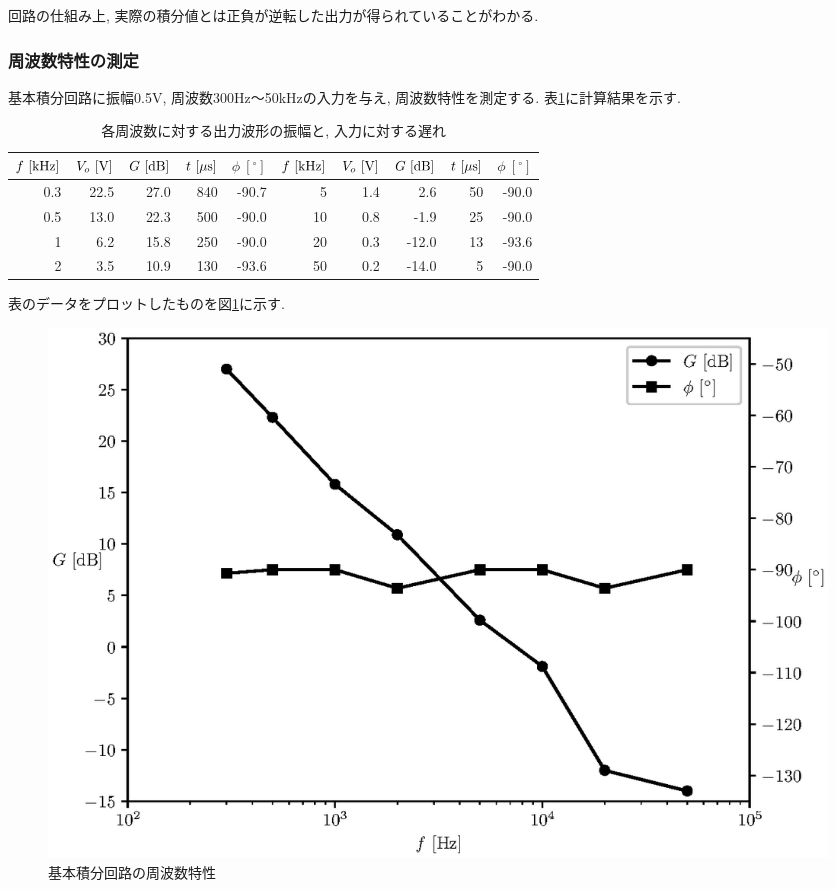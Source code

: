 \documentclass[titlepage]{jsarticle}
\begin{document}
            回路の仕組み上,
            実際の積分値とは正負が逆転した出力が得られていることがわかる.

        \subsubsection{周波数特性の測定} \label{sec:ex4}
            基本積分回路に振幅0.5V,
            周波数300Hz〜50kHzの入力を与え,
            周波数特性を測定する.
            表\ref{tab:int}に計算結果を示す.

            \begin{table}[h]
                \caption{各周波数に対する出力波形の振幅と, 入力に対する遅れ}
                \label{tab:int}
                \centering
                \begin{tabular}{r|rr|rr||r|rr|rr}
                    $f \ [\rm{kHz}]$ & $V_o \ [\rm{V]}$ & $G \ [\rm{dB}]$ & $t \ [\mu\rm{s}]$ & $\phi \ [^\circ]$ & $f \ [\rm{kHz}]$ & $V_o \ [\rm{V]}$ & $G \ [\rm{dB}]$ & $t \ [\mu\rm{s}]$ & $\phi \ [^\circ]$ \\ \hline \hline
                    0.3 & 22.5 & 27.0 & 840 & -90.7 & 5 & 1.4 & 2.6 & 50 & -90.0 \\
                    0.5 & 13.0 & 22.3 & 500 & -90.0 & 10 & 0.8 & -1.9 & 25 & -90.0 \\
                    1 & 6.2 & 15.8 & 250 & -90.0 & 20 & 0.3 & -12.0 & 13 & -93.6 \\
                    2 & 3.5 & 10.9 & 130 & -93.6 & 50 & 0.2 & -14.0 & 5 & -90.0 \\
                \end{tabular}
            \end{table}

            表のデータをプロットしたものを図\ref{fig:intex1}に示す.

            \begin{figure}[h]
                \centering
                \includegraphics[width=0.8\hsize]{img/intex-graph1.eps}
                \caption{基本積分回路の周波数特性}
                \label{fig:intex1}
            \end{figure}
\end{document}
